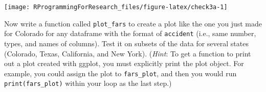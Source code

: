 \documentclass[]{book}
\makeatletter
\newenvironment{Shaded}{\begin{snugshade}}{\end{snugshade}}
\newcommand{\KeywordTok}[1]{\textcolor[rgb]{0.13,0.29,0.53}{\textbf{#1}}}
\newcommand{\DataTypeTok}[1]{\textcolor[rgb]{0.13,0.29,0.53}{#1}}
\newcommand{\DecValTok}[1]{\textcolor[rgb]{0.00,0.00,0.81}{#1}}
\newcommand{\CharTok}[1]{\textcolor[rgb]{0.31,0.60,0.02}{#1}}
\newcommand{\StringTok}[1]{\textcolor[rgb]{0.31,0.60,0.02}{#1}}
\newcommand{\OperatorTok}[1]{\textcolor[rgb]{0.81,0.36,0.00}{\textbf{#1}}}
\newcommand{\NormalTok}[1]{#1}
\newenvironment{kframe}{%
\medskip{}
\setlength{\fboxsep}{.8em}
 \def\at@end@of@kframe{}%
 \ifinner\ifhmode%
  \def\at@end@of@kframe{\end{minipage}}%
  \begin{minipage}{\columnwidth}%
 \fi\fi%
 \def\FrameCommand##1{\hskip\@totalleftmargin \hskip-\fboxsep
 \colorbox{shadecolor}{##1}\hskip-\fboxsep
     \hskip-\linewidth \hskip-\@totalleftmargin \hskip\columnwidth}%
 \MakeFramed {\advance\hsize-\width
   \@totalleftmargin\z@ \linewidth\hsize
   \@setminipage}}%
 {\par\unskip\endMakeFramed%
 \at@end@of@kframe}
\renewenvironment{Shaded}{\begin{kframe}}{\end{kframe}}
\theoremstyle{definition}
\theoremstyle{definition}
\theoremstyle{definition}
\theoremstyle{remark}
\makeatother
\begin{document}
\begin{Shaded}
\end{Shaded}

\begin{center}\texttt{[image: RProgrammingForResearch\_files/figure-latex/check3a-1]} \end{center}

Now write a function called \texttt{plot\_fars} to create a plot like
the one you just made for Colorado for any dataframe with the format of
\texttt{accident} (i.e., same number, types, and names of columns). Test
it on subsets of the data for several states (Colorado, Texas,
California, and New York). (\emph{Hint}: To get a function to print out
a plot created with ggplot, you must explicitly print the plot object.
For example, you could assign the plot to \texttt{fars\_plot}, and then
you would run \texttt{print(fars\_plot)} within your loop as the last
step.)
\end{document}
